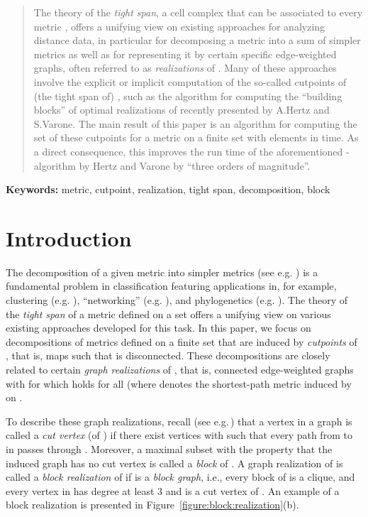\documentclass[12pt]{article}
\begin{document}
\begin{abstract}
The theory of the {\em tight span}, a  
cell complex 
that can be associated to every metric , 
offers a unifying view on existing approaches
for analyzing distance data, in particular 
for decomposing a
metric  
into a sum of simpler metrics
as well as for representing it
by certain specific edge-weighted graphs,
often referred to as 
{\em realizations} of .
Many of these approaches involve the explicit or implicit
computation of the so-called cutpoints of 
(the tight span of) ,
such as the algorithm for computing the
``building blocks'' of
optimal realizations of  recently presented by A.Hertz and S.Varone.
The main result of this paper is an algorithm for computing
the set of these cutpoints for a metric  on a finite
set with  elements in  time.
As a direct consequence, this improves the run time of the aforementioned
-algorithm by Hertz and Varone by ``three orders of magnitude''.
\end{abstract}

\noindent
\textbf{Keywords:} metric, cutpoint, realization, tight span, decomposition, block

\section{Introduction}
\label{section:introduction}


The decomposition of a given metric into simpler metrics 
(see e.g. \cite{deza:laurent:cuts:1997})
is a fundamental problem in classification featuring  applications in, for example, 
clustering (e.g. \cite{bryant:berry:clustering:2001}), 
``networking'' (e.g. \cite{chu-gar-gra-01a}), and 
phylogenetics (e.g. \cite{huson:bryant:networks2005}). 
The theory of the \emph{tight span} 
of a metric  defined on a set  \cite{isbell:six:theorems:1964,dress:tight:extensions:1984}
offers a unifying view on various existing approaches developed for 
this task. 
In this paper, we focus on decompositions of metrics  
defined on a finite set  that are induced by \emph{cutpoints} of , that is, maps  
such that  is disconnected. These decompositions
are closely related to  certain \emph{graph realizations} of ,
that is, connected edge-weighted graphs  with  
for which  holds for all  (where  denotes the shortest-path metric induced by  on .

To describe these graph realizations,
recall (see e.g.\,\cite{wes-96a})
that a vertex  in a  
graph  is called a 
\emph{cut vertex} (of ) if there exist vertices  with   such that every path from  to  in  passes through . 
Moreover, a maximal subset  
with the property that the induced graph 
has no cut vertex is called a \emph{block} of .
A graph realization  of  is called a \emph{block realization} of  if  is a {\em block graph}, i.e., every 
block of  is a clique, and every vertex in  has degree at least 3 and
is a cut vertex of . 
An example of a block realization is presented in Figure~\ref{figure:block:realization}(b).
\end{document}
